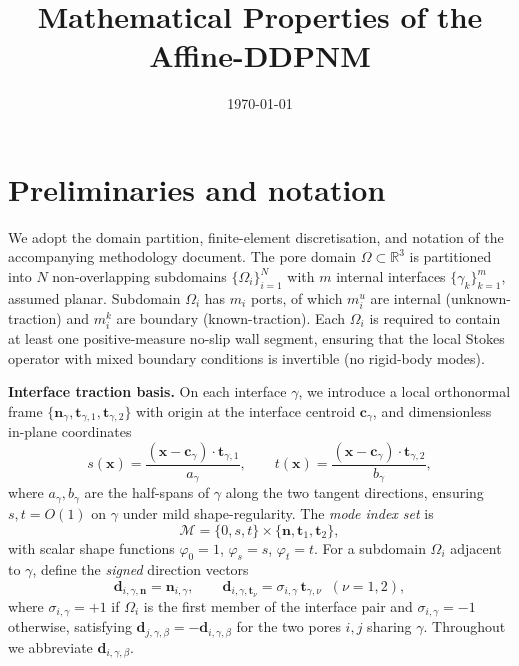 \documentclass[11pt,a4paper]{article}
\newcommand{\R}{\mathbb{R}}
\newcommand{\dom}{\Omega}
\newcommand{\pore}[1]{\Omega_{#1}}
\newcommand{\iface}{\gamma}
\newcommand{\normal}{\bm{n}}
\newcommand{\modeset}{\mathcal{M}}
\begin{document}
\title{\textbf{Mathematical Properties of the Affine-DDPNM}}
\author{}
\date{\today}
\maketitle

\section{Preliminaries and notation}

We adopt the domain partition, finite-element discretisation, and notation
of the accompanying methodology document.  The pore domain
$\dom \subset \R^3$ is partitioned into $N$ non-overlapping subdomains
$\{\pore{i}\}_{i=1}^N$ with $m$ internal interfaces
$\{\iface_k\}_{k=1}^m$, assumed planar.
Subdomain $\pore{i}$ has $m_i$ ports, of which $m_i^u$ are internal
(unknown-traction) and $m_i^k$ are boundary (known-traction).
Each $\pore{i}$ is required to contain at least one positive-measure
no-slip wall segment, ensuring that the local Stokes operator with
mixed boundary conditions is invertible (no rigid-body modes).

\medskip\noindent
\textbf{Interface traction basis.}
On each interface $\iface$, we introduce a local orthonormal frame
$\{\normal_\iface, \bm{t}_{\iface,1}, \bm{t}_{\iface,2}\}$ with origin at the
interface centroid $\bm{c}_\iface$, and dimensionless in-plane coordinates
\begin{equation}\label{eq:local-coords}
  s(\bm{x}) = \frac{(\bm{x}-\bm{c}_\iface)\cdot\bm{t}_{\iface,1}}{a_\iface},\qquad
  t(\bm{x}) = \frac{(\bm{x}-\bm{c}_\iface)\cdot\bm{t}_{\iface,2}}{b_\iface},
\end{equation}
where $a_\iface, b_\iface$ are the half-spans of $\iface$ along the two
tangent directions, ensuring $s,t = O(1)$ on $\iface$ under mild
shape-regularity.  The \emph{mode index set} is
\begin{equation}\label{eq:modeset}
  \modeset = \{0,s,t\} \times \{\normal, \bm{t}_1, \bm{t}_2\},
\end{equation}
with scalar shape functions $\varphi_0 = 1$, $\varphi_s = s$, $\varphi_t = t$.
For a subdomain $\pore{i}$ adjacent to $\iface$, define the \emph{signed}
direction vectors
\begin{equation}\label{eq:signed-dir}
  \bm{d}_{i,\iface,\normal} = \normal_{i,\iface},\qquad
  \bm{d}_{i,\iface,\bm{t}_\nu} = \sigma_{i,\iface}\,\bm{t}_{\iface,\nu}
  \;\;(\nu=1,2),
\end{equation}
where $\sigma_{i,\iface}=+1$ if $\pore{i}$ is the first member of the
interface pair and $\sigma_{i,\iface}=-1$ otherwise, satisfying
$\bm{d}_{j,\iface,\beta} = -\bm{d}_{i,\iface,\beta}$ for the two pores
$i,j$ sharing $\iface$.  Throughout we abbreviate $\bm{d}_{i,\gamma,\beta}$.
\end{document}
